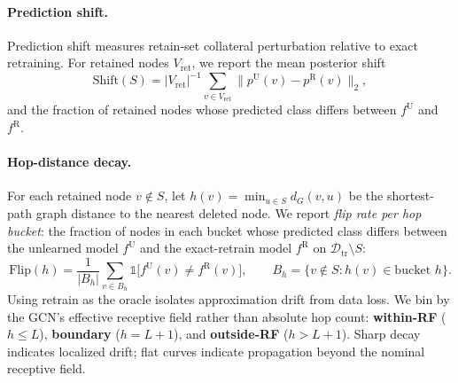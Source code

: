 \paragraph{Prediction shift.} Prediction shift measures retain-set
collateral perturbation relative to exact retraining. For retained nodes
$V_{\mathrm{ret}}$, we report the mean posterior shift
\[
\mathrm{Shift}(S)
= |V_{\mathrm{ret}}|^{-1}
\sum_{v\in V_{\mathrm{ret}}}
\|p^{\mathrm{U}}(v)-p^{\mathrm{R}}(v)\|_2,
\]
and the fraction of retained nodes whose predicted class differs between
$f^{\mathrm{U}}$ and $f^{\mathrm{R}}$.

\paragraph{Hop-distance decay.}
For each retained node $v\notin S$, let $h(v)=\min_{u\in S}d_G(v,u)$
be the shortest-path graph distance to the nearest deleted node. We
report \emph{flip rate per hop bucket}: the fraction of nodes in each
bucket whose predicted class differs between the unlearned model
$f^{\mathrm{U}}$ and the exact-retrain model $f^{\mathrm{R}}$ on
$\mathcal{D}_{\mathrm{tr}}\setminus S$:
\begin{equation}
\label{eq:hopflip}
\mathrm{Flip}(h) = \frac{1}{|B_h|}\sum_{v\in B_h}\mathbb{1}\bigl[f^{\mathrm{U}}(v)\neq f^{\mathrm{R}}(v)\bigr],
\qquad
B_h = \{v\notin S : h(v)\in\text{bucket } h\}.
\end{equation}
Using retrain as the oracle isolates approximation drift from data loss.
We bin by the GCN's effective receptive field rather than absolute hop
count: \textbf{within-RF} ($h\le L$), \textbf{boundary} ($h=L+1$), and
\textbf{outside-RF} ($h>L+1$). Sharp decay indicates localized drift;
flat curves indicate propagation beyond the nominal receptive field.
